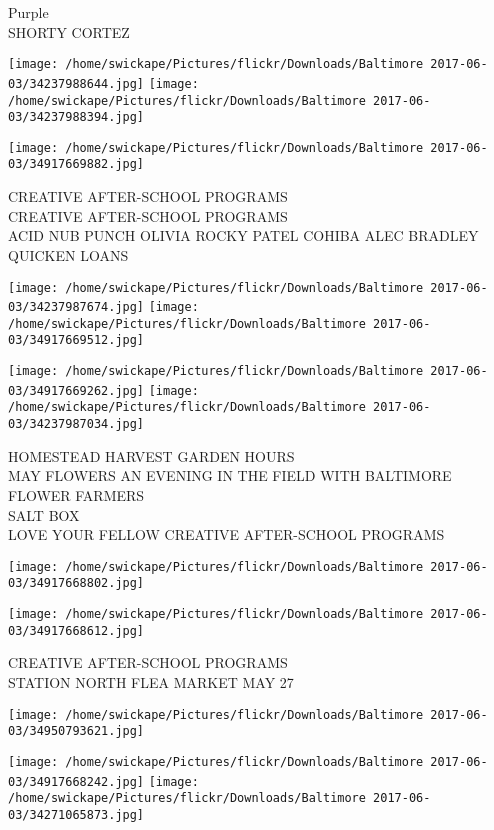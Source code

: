 \documentclass[10pt,letterpaper]{article}
\begin{document}
Purple\\
SHORTY CORTEZ
\pagebreak

\texttt{[image: /home/swickape/Pictures/flickr/Downloads/Baltimore 2017-06-03/34237988644.jpg]}
\texttt{[image: /home/swickape/Pictures/flickr/Downloads/Baltimore 2017-06-03/34237988394.jpg]}

\vspace{0.25in}
\texttt{[image: /home/swickape/Pictures/flickr/Downloads/Baltimore 2017-06-03/34917669882.jpg]}

CREATIVE AFTER{-}SCHOOL PROGRAMS\\
CREATIVE AFTER{-}SCHOOL PROGRAMS\\
ACID NUB PUNCH OLIVIA ROCKY PATEL COHIBA ALEC BRADLEY QUICKEN LOANS
\pagebreak

\texttt{[image: /home/swickape/Pictures/flickr/Downloads/Baltimore 2017-06-03/34237987674.jpg]}
\texttt{[image: /home/swickape/Pictures/flickr/Downloads/Baltimore 2017-06-03/34917669512.jpg]}

\texttt{[image: /home/swickape/Pictures/flickr/Downloads/Baltimore 2017-06-03/34917669262.jpg]}
\texttt{[image: /home/swickape/Pictures/flickr/Downloads/Baltimore 2017-06-03/34237987034.jpg]}

HOMESTEAD HARVEST GARDEN HOURS\\
MAY FLOWERS AN EVENING IN THE FIELD WITH BALTIMORE FLOWER FARMERS\\
SALT BOX\\
LOVE YOUR FELLOW CREATIVE AFTER{-}SCHOOL PROGRAMS
\pagebreak

\texttt{[image: /home/swickape/Pictures/flickr/Downloads/Baltimore 2017-06-03/34917668802.jpg]}

\vspace{0.25in}
\texttt{[image: /home/swickape/Pictures/flickr/Downloads/Baltimore 2017-06-03/34917668612.jpg]}

CREATIVE AFTER{-}SCHOOL PROGRAMS\\
STATION NORTH FLEA MARKET MAY 27
\pagebreak

\texttt{[image: /home/swickape/Pictures/flickr/Downloads/Baltimore 2017-06-03/34950793621.jpg]}

\vspace{0.25in}
\texttt{[image: /home/swickape/Pictures/flickr/Downloads/Baltimore 2017-06-03/34917668242.jpg]}
\texttt{[image: /home/swickape/Pictures/flickr/Downloads/Baltimore 2017-06-03/34271065873.jpg]}
\end{document}

